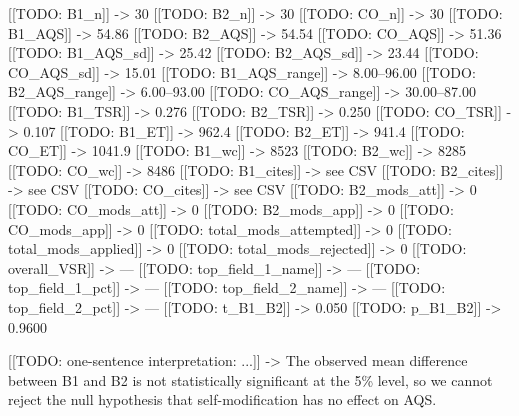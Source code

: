 
[[TODO: B1\_n]]  ->  30
[[TODO: B2\_n]]  ->  30
[[TODO: CO\_n]]  ->  30
[[TODO: B1\_AQS]]  ->  54.86
[[TODO: B2\_AQS]]  ->  54.54
[[TODO: CO\_AQS]]  ->  51.36
[[TODO: B1\_AQS\_sd]]  ->  25.42
[[TODO: B2\_AQS\_sd]]  ->  23.44
[[TODO: CO\_AQS\_sd]]  ->  15.01
[[TODO: B1\_AQS\_range]]  ->  8.00--96.00
[[TODO: B2\_AQS\_range]]  ->  6.00--93.00
[[TODO: CO\_AQS\_range]]  ->  30.00--87.00
[[TODO: B1\_TSR]]  ->  0.276
[[TODO: B2\_TSR]]  ->  0.250
[[TODO: CO\_TSR]]  ->  0.107
[[TODO: B1\_ET]]  ->  962.4
[[TODO: B2\_ET]]  ->  941.4
[[TODO: CO\_ET]]  ->  1041.9
[[TODO: B1\_wc]]  ->  8523
[[TODO: B2\_wc]]  ->  8285
[[TODO: CO\_wc]]  ->  8486
[[TODO: B1\_cites]]  ->  see CSV
[[TODO: B2\_cites]]  ->  see CSV
[[TODO: CO\_cites]]  ->  see CSV
[[TODO: B2\_mods\_att]]  ->  0
[[TODO: CO\_mods\_att]]  ->  0
[[TODO: B2\_mods\_app]]  ->  0
[[TODO: CO\_mods\_app]]  ->  0
[[TODO: total\_mods\_attempted]]  ->  0
[[TODO: total\_mods\_applied]]  ->  0
[[TODO: total\_mods\_rejected]]  ->  0
[[TODO: overall\_VSR]]  ->  ---
[[TODO: top\_field\_1\_name]]  ->  ---
[[TODO: top\_field\_1\_pct]]  ->  ---
[[TODO: top\_field\_2\_name]]  ->  ---
[[TODO: top\_field\_2\_pct]]  ->  ---
[[TODO: t\_B1\_B2]]  ->  0.050
[[TODO: p\_B1\_B2]]  ->  0.9600

[[TODO: one-sentence interpretation: ...]]  ->  The observed mean difference between B1 and B2 is not statistically significant at the 5\% level, so we cannot reject the null hypothesis that self-modification has no effect on AQS.
